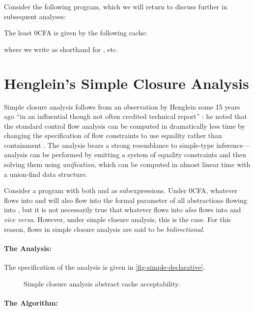 Consider the following program, which we will return to discuss
further in subsequent analyses:



The least 0CFA is given by the following cache:

where we write  as shorthand for , etc.


\section{Henglein's Simple Closure Analysis}
\label{sec:simple}

Simple closure analysis follows from an observation by Henglein some
15 years ago ``in an influential though not often credited technical
report'' \cite[page 4]{midtgaard-07}: he noted that the standard
control flow analysis can be computed in dramatically less time by
changing the specification of flow constraints to use equality rather
than containment \cite{henglein92d}.  The analysis bears a strong
resemblance to simple-type inference---analysis can be performed by
emitting a system of equality constraints and then solving them using
{\em unification}, which can be computed in almost linear time with a
union-find data structure.

Consider a program with both  and  as subexpressions.
Under 0CFA, whatever flows into  and  will also flow into the
formal parameter of all abstractions flowing into , but it is not
necessarily true that whatever flows into  {\em also} flows into
 and {\em vice versa}.  However, under simple closure analysis,
this is the case.  For this reason, flows in simple closure analysis
are said to be {\em bidirectional}.

\paragraph{The Analysis:} 

The specification of the analysis is given in
\autoref{fig-simple-declarative}.

\begin{figure}[h]

\caption{Simple closure analysis abstract cache acceptability.}
\label{fig-simple-declarative}
\end{figure}

\paragraph{The Algorithm:} 

